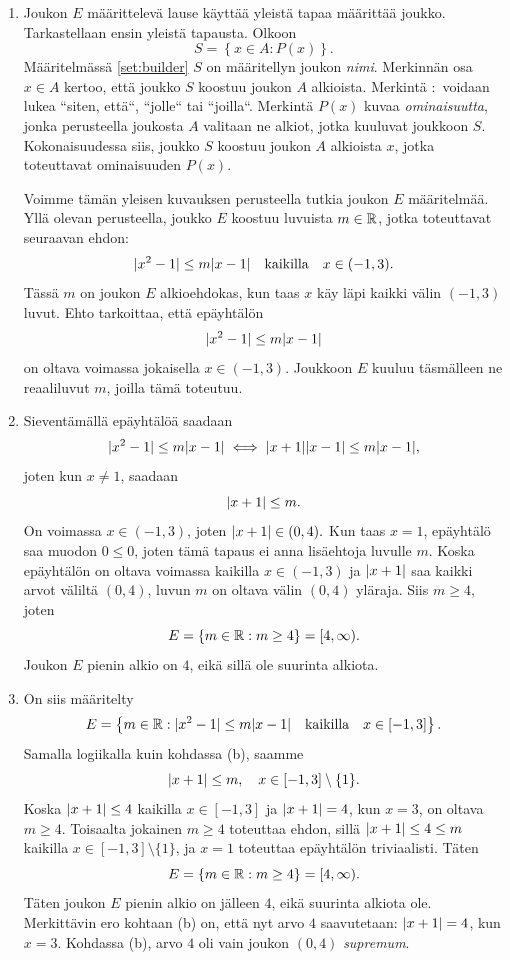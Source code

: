 \documentclass[12pt,a4paper]{article}
\begin{document}
\begin{solution}
\leavevmode\par
\begin{enumerate}[label=\alph*), nosep]
\item Joukon \(E\) määrittelevä lause käyttää yleistä tapaa määrittää joukko.
Tarkastellaan ensin yleistä tapausta. Olkoon
\begin{equation}\label{set:builder}
S = \left\{x \in A : P(x)\right\}.
\end{equation}
Määritelmässä \ref{set:builder} \(S\) on määritellyn joukon \emph{nimi}.
Merkinnän osa \(x \in A\) kertoo, että joukko \(S\) koostuu joukon \(A\)
alkioista. Merkintä \(:\) voidaan lukea ``siten, että``, ``jolle``
tai ``joilla``. Merkintä \(P(x)\) kuvaa \emph{ominaisuutta},
jonka perusteella joukosta \(A\) valitaan ne alkiot, jotka kuuluvat joukkoon
\(S\). Kokonaisuudessa siis, joukko \(S\) koostuu joukon \(A\) alkioista \(x\),
jotka toteuttavat ominaisuuden \(P(x)\).

Voimme tämän yleisen kuvauksen perusteella tutkia joukon \(E\) määritelmää.
Yllä olevan perusteella, joukko \(E\) koostuu luvuista \(m \in \mathbb{R}\),
jotka toteuttavat seuraavan ehdon:
\[\lvert x^2 - 1\rvert \leq m\lvert x - 1\rvert \quad \text{kaikilla} \quad x \in (-1, 3).\]
Tässä \(m\) on joukon \(E\) alkioehdokas, kun taas \(x\) käy läpi kaikki välin
\((-1, 3)\) luvut. Ehto tarkoittaa, että epäyhtälön
\[\lvert x^2 - 1\rvert \leq m\lvert x - 1\rvert\]
on oltava voimassa jokaisella \(x \in (-1, 3)\). Joukkoon \(E\) kuuluu
täsmälleen ne reaaliluvut \(m\), joilla tämä toteutuu.
\item Sieventämällä epäyhtälöä saadaan
\[\lvert x^2 - 1\rvert \leq m\lvert x - 1\rvert \iff \lvert x + 1\rvert\lvert x - 1\rvert \leq
m\lvert x - 1\rvert,\]
joten kun \(x \neq 1\), saadaan
\[\lvert x + 1\rvert \leq m.\]
On voimassa \(x \in (-1, 3)\), joten \(\lvert x + 1\rvert \in (0, 4).\) Kun taas
\(x = 1\), epäyhtälö saa muodon \(0 \leq 0\), joten tämä tapaus ei anna
lisäehtoja luvulle \(m\).
Koska epäyhtälön on oltava voimassa kaikilla \(x \in (-1,3)\) ja
\(\lvert x + 1\rvert\) saa kaikki arvot väliltä \((0, 4)\), luvun \(m\) on oltava
välin \((0,4)\) yläraja. Siis \(m \ge 4\), joten
\[E=\{m \in \mathbb{R} : m \geq 4\} = [4, \infty).\]
Joukon \(E\) pienin alkio on \(4\), eikä sillä ole suurinta alkiota.
\item On siis määritelty
\[E = \left\{m \in \mathbb{R} : \lvert x^2 - 1\rvert \leq m\lvert x - 1\rvert \quad
\text{kaikilla} \quad x \in [-1, 3] \right\}.\]
Samalla logiikalla kuin kohdassa (b), saamme
\[\lvert x + 1\rvert \leq m, \quad x \in [-1, 3] \setminus{\{1\}}.\]
Koska \(\lvert x + 1\rvert \leq 4\) kaikilla \(x \in [-1, 3]\) ja \(\lvert x + 1\rvert = 4\),
kun \(x = 3\), on oltava \(m \geq 4\). Toisaalta jokainen
\(m \geq 4\) toteuttaa ehdon, sillä \(\lvert x + 1\rvert \leq 4 \leq m\)
kaikilla \(x \in [-1, 3] \setminus{\{1\}}\), ja \(x = 1\) toteuttaa
epäyhtälön triviaalisti. Täten
\[E = \{m \in \mathbb{R} : m \geq 4\} = [4, \infty).\]
Täten joukon \(E\) pienin alkio on jälleen \(4\), eikä suurinta alkiota ole.
Merkittävin ero kohtaan (b) on, että nyt arvo \(4\) saavutetaan:
\(\lvert x + 1\rvert = 4\), kun \(x = 3\). Kohdassa (b), arvo \(4\) oli vain
joukon \((0, 4)\) \emph{supremum}.
\end{enumerate}
\end{solution}
\end{document}
